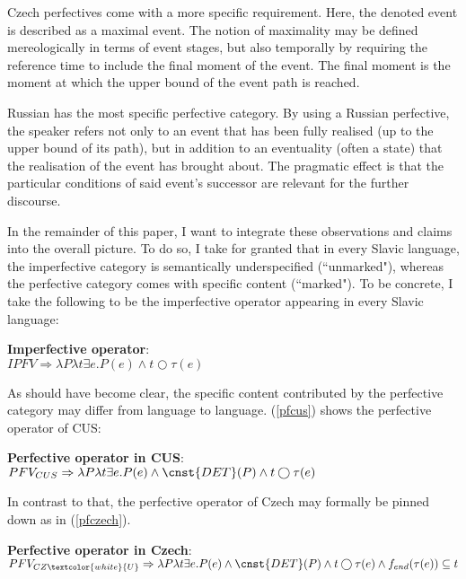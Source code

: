 \documentclass[output=paper,colorlinks,citecolor=brown]{langscibook}
\begin{document}
Czech perfectives come with a more specific requirement.
Here, the denoted event is described as a maximal event. The notion of maximality may be defined mereologically in terms of event stages, but also temporally by requiring the reference time to include the final moment of the event.
The final moment is the moment at which the upper bound of the event path is reached. 

Russian has the most specific perfective category. By using a Russian perfective, the speaker refers not only to an event that has been fully realised (up to the upper bound of its path), but in addition to an eventuality (often a state) that the realisation of the event has brought about. The pragmatic effect is that the particular conditions of said event's successor are relevant for the further discourse. 

In the remainder of this paper, I want to integrate 
these observations and claims into the overall picture. To do so, 
I take for granted that in every Slavic language, the imperfective category is semantically underspecified (``unmarked"), whereas the perfective category comes with specific content (``marked"). To be concrete, I take the following to be the imperfective operator appearing in every Slavic language:  

    \ea\label{ipfoperator}
\textbf{Imperfective operator}:\\
$IPFV \Rightarrow  \lambda P \lambda t \exists e. P(e) \wedge t \bigcirc \tau(e)$ 
\z

\noindent As should have become clear, the specific content contributed by the perfective category may differ from language to language. (\ref{pfcus}) shows the perfective operator of CUS:

    \ea\label{pfcus}
\textbf{Perfective operator in CUS}:\\
$PFV_{CUS} \Rightarrow  \lambda P \lambda t \exists e . P(e) \wedge \cnst{DET}(P) \wedge t \bigcirc \tau(e)$ 
\z

\noindent In contrast to that, the perfective operator of Czech may formally be pinned down as in (\ref{pfczech}). 

    \ea\label{pfczech}
\textbf{Perfective operator in Czech}:\\
$PFV_{CZ\textcolor{white}{U}} \Rightarrow  \lambda P \lambda t \exists e . P(e) \wedge \cnst{DET}(P) \wedge t \bigcirc \tau(e) \wedge f_{end}(\tau(e)) \subseteq t$
\z
\end{document}
